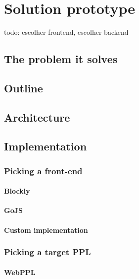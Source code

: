 \chapter{Solution prototype}\label{chap:chap3}

todo: escolher frontend, escolher backend

\section{The problem it solves}


\section{Outline}

\section{Architecture}

\section{Implementation}

\subsection{Picking a front-end}

\subsubsection{Blockly}

\subsubsection{GoJS}

\subsubsection{Custom implementation}

\subsection{Picking a target PPL}

\subsubsection{WebPPL}

